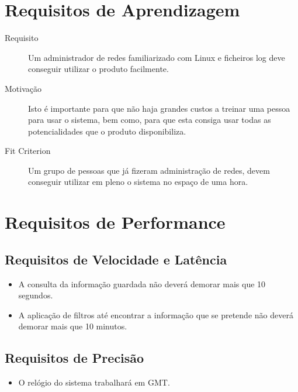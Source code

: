 



\section{Requisitos de Aprendizagem}
\begin{description}
\item[Requisito] Um administrador de redes familiarizado com Linux e ficheiros log deve conseguir utilizar o produto facilmente.
\item[Motivação] Isto é importante para que não haja grandes custos a treinar uma pessoa para usar o sistema, bem como, para que esta consiga usar 
todas as potencialidades que o produto disponibiliza.
\item[Fit Criterion] Um grupo de pessoas que já fizeram administração de redes, devem conseguir utilizar em pleno o sistema no espaço de uma hora.
\end{description}







\section{Requisitos de Performance}
\subsection{Requisitos de Velocidade e Latência}
\begin{itemize}
\item A consulta da informação guardada não deverá demorar mais que 10 segundos.
\item A aplicação de filtros até encontrar a informação que se pretende não deverá demorar mais que 10 minutos.
\end{itemize}





\subsection{Requisitos de Precisão}
\begin{itemize}
\item O relógio do sistema trabalhará em GMT.
\end{itemize}

